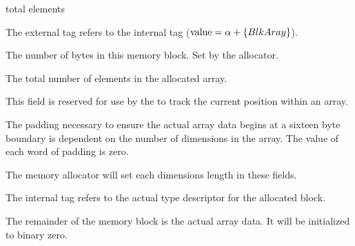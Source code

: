 \begin{TDfields}{total elements}
  \item[external tag] The external tag refers to the internal tag
    ($\textrm{value} = \alpha + \left\lbrace BlkAray \right\rbrace$).

  \item[block size] The number of bytes in this memory block.  Set by
    the allocator.

  \item[total elements] The total number of elements in the allocated
    array.

  \item[q.arrpos] This field is reserved for use by the \gc to track
    the current position within an array.

  \item[padding] The padding necessary to ensure the actual array data
    begins at a sixteen byte boundary is dependent on the number of
    dimensions in the array.  The value of each word of padding is
    zero.

  \item[\texttt{LEN}] The memory allocator will set each dimensions
    length in these fields.

  \item[internal tag]  The internal tag refers to the actual type
    descriptor for the allocated block.

  \item[array data]  The remainder of the memory block is the actual
    array data.  It will be initialized to binary zero.
\end{TDfields}

